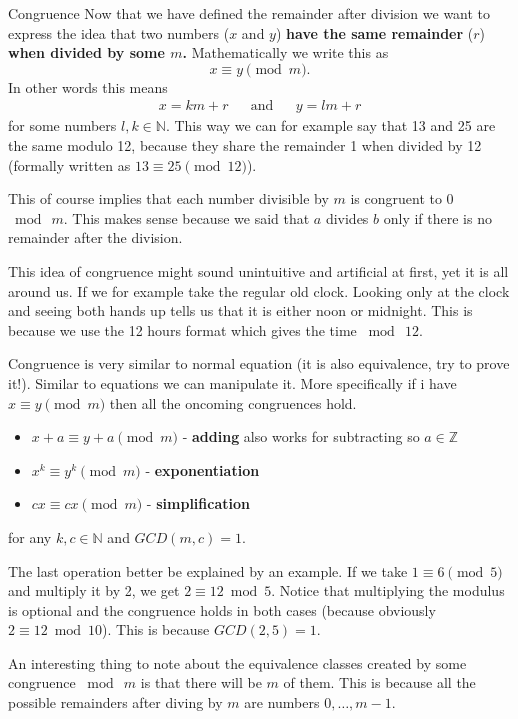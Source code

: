 \documentclass[final]{beamer}
\newlength{\colwidth}
\newcommand{\N}{\mathbb{N}}
\begin{document}
\begin{frame}[t]
\begin{columns}[t]
\begin{column}{\colwidth}
\begin{block}{Congruence}
 Now that we have defined the remainder after division we want to express the
 idea that two numbers ($x$ and $y$) \textbf{have the same remainder} ($r$) \textbf{when divided
 by some $m$.} Mathematically we write this as
 \[
  x \equiv y \pmod{m}.
 \]
 In other words this means
 \begin{align*}
  x = km + r && \text{and}  && y = lm + r
 \end{align*}
 for some numbers $l,k \in \N$. This way we can for example say that 13 and 25
 are the same modulo 12, because they share the remainder 1 when divided by 12
 (formally written as  $13 \equiv 25 \pmod{12}$).

 This of course implies that each number divisible by $m$ is congruent to 0
 $\bmod ~m$. This makes sense because we said that $a$ divides $b$ only if there
 is no remainder after the division.

 This idea of congruence might sound unintuitive and artificial at first, yet it
 is all around us. If we for example take the regular old clock. Looking only at
 the clock and seeing both hands up tells us that it is either noon or midnight.
 This is because we use the 12 hours format which gives the time $ \bmod~12$.

Congruence is very similar to normal equation (it is also
equivalence, try to prove it!). Similar to equations we can manipulate it.
More specifically if i have $x \equiv y \pmod{m}$ then all the oncoming
congruences hold.
\begin{itemize}[label=\textbullet,left=24pt]
 \item $x+a \equiv y+a \pmod{m}$ - \textbf{adding} also works for subtracting so
  $a \in \mathbb{Z}$
 \item $x^k \equiv y^k \pmod{m}$ - \textbf{exponentiation}
 \item $cx \equiv cx \pmod{m}$ - \textbf{simplification}
\end{itemize}
for any $k,c \in \N$ and $GCD(m,c)=1$.

The last operation better be explained by an example. If we take $1 \equiv 6
\pmod{5}$ and multiply it by 2, we get $2 \equiv 12 \bmod{5}$. Notice that
multiplying the modulus is optional and the congruence holds in both cases
(because obviously $2 \equiv 12 \bmod{10}$). This
is because $GCD(2,5)=1$.

An interesting thing to note about the equivalence classes created by some
congruence $\bmod~m$ is that there will be $m$ of them. This is because all the
possible remainders after diving by $m$ are numbers $0, \ldots, m-1$. 


\end{block}
\end{column}
\end{columns}
\end{frame}
\end{document}
